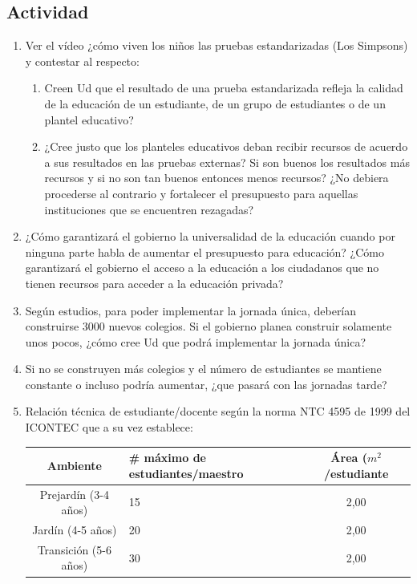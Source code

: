 \documentclass[10pt,twoside]{article}
\begin{document}
\subsection*{Actividad}
\begin{enumerate}
\item Ver el vídeo ¿cómo viven los niños las pruebas estandarizadas (Los Simpsons) y contestar al respecto:
\begin{enumerate}
\item Creen Ud que el resultado de una prueba estandarizada refleja la calidad de la educación de un estudiante, de un grupo de estudiantes o de un plantel educativo?
\item ¿Cree justo que los planteles educativos deban recibir recursos de acuerdo a sus resultados en las pruebas externas? Si son buenos los resultados más recursos y si no son tan buenos entonces menos recursos? ¿No debiera procederse al contrario y fortalecer el presupuesto para aquellas instituciones que se encuentren rezagadas?
\end{enumerate}
\item ¿Cómo garantizará el gobierno la universalidad de la educación cuando por ninguna parte habla de aumentar el presupuesto para educación? ¿Cómo garantizará el gobierno el acceso a la educación a los ciudadanos que no tienen recursos para acceder a la educación privada?
\item Según estudios, para poder implementar la jornada única, deberían construirse 3000 nuevos colegios. Si el gobierno planea construir solamente unos pocos, ¿cómo cree Ud que podrá implementar la jornada única?
\item Si no se construyen más colegios y el número de estudiantes se mantiene constante o incluso podría aumentar, ¿que pasará con las jornadas tarde?
\item Relación técnica de estudiante/docente según la norma NTC 4595 de 1999 del ICONTEC que a su vez establece:
\begin{center}
\begin{tabular}{|c|p{3.5cm}|c|}
\hline 
Ambiente & \# máximo de estudiantes/maestro & Área ($m^{2}$/estudiante \\ 
\hline 
Prejardín (3-4 años) & \hspace*{1cm}15 & 2,00 \\ 
Jardín (4-5 años) & \hspace*{1cm}20 & 2,00 \\ 
Transición (5-6 años) & \hspace*{1cm}30 & 2,00 \\ 

\end{tabular}
\end{center}
\end{enumerate}
\end{document}
